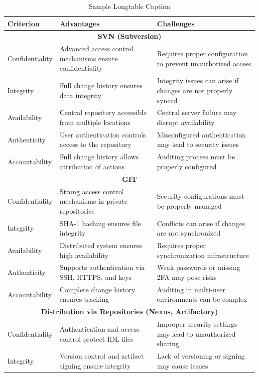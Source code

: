 \documentclass[runningheads,12pt]{llncs}
\begin{document}
\begin{longtable}{|p{4cm}|p{4cm}|p{4cm}|}
\caption{Sample Longtable Caption} \\
\hline
\textbf{Criterion} & \textbf{Advantages} & \textbf{Challenges} \\ \hline
\multicolumn{3}{|c|}{\textbf{SVN (Subversion)}} \\ \hline
Confidentiality & Advanced access control mechanisms ensure confidentiality & Requires proper configuration to prevent unauthorized access \\ \hline
Integrity & Full change history ensures data integrity & Integrity issues can arise if changes are not properly synced \\ \hline
Availability & Central repository accessible from multiple locations & Central server failure may disrupt availability \\ \hline
Authenticity & User authentication controls access to the repository & Misconfigured authentication may lead to security issues \\ \hline
Accountability & Full change history allows attribution of actions & Auditing process must be properly configured \\ \hline
\multicolumn{3}{|c|}{\textbf{GIT}} \\ \hline
Confidentiality & Strong access control mechanisms in private repositories & Security configurations must be properly managed \\ \hline
Integrity & SHA-1 hashing ensures file integrity & Conflicts can arise if changes are not synchronized \\ \hline
Availability & Distributed system ensures high availability & Requires proper synchronization infrastructure \\ \hline
Authenticity & Supports authentication via SSH, HTTPS, and keys & Weak passwords or missing 2FA may pose risks \\ \hline
Accountability & Complete change history ensures tracking & Auditing in multi-user environments can be complex \\ \hline
\multicolumn{3}{|c|}{\textbf{Distribution via Repositories (Nexus, Artifactory)}} \\ \hline
Confidentiality & Authentication and access control protect IDL files & Improper security settings may lead to unauthorized sharing \\ \hline
Integrity & Version control and artifact signing ensure integrity & Lack of versioning or signing may cause issues \\ \hline

\end{longtable}
\end{document}
